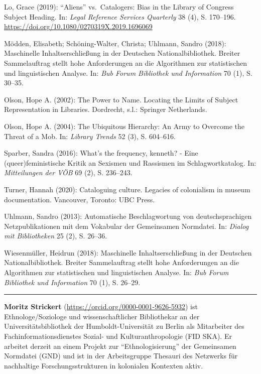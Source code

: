 \documentclass[a4paper,
fontsize=11pt,
oneside,
numbers=noperiodatend,
parskip=half-,
bibliography=totoc,
final
]{scrartcl}
\begin{document}
Lo, Grace (2019): \enquote{Aliens} vs.~Catalogers: Bias in the Library
of Congress Subject Heading. In: \emph{Legal Reference Services
Quarterly} 38 (4), S. 170--196.
\url{https://doi.org/10.1080/0270319X.2019.1696069}

Mödden, Elisabeth; Schöning-Walter, Christa; Uhlmann, Sandro (2018):
Maschinelle Inhaltserschließung in der Deutschen Nationalbibliothek.
Breiter Sammelauftrag stellt hohe Anforderungen an die Algorithmen zur
statistischen und linguistischen Analyse. In: \emph{Bub Forum Bibliothek
und Information} 70 (1), S. 30--35.

Olson, Hope A. (2002): The Power to Name. Locating the Limits of Subject
Representation in Libraries. Dordrecht, s.l.: Springer Netherlands.

Olson, Hope A. (2004): The Ubiquitous Hierarchy: An Army to Overcome the
Threat of a Mob. In: \emph{Library Trends} 52 (3), S. 604--616.

Sparber, Sandra (2016): What's the frequency, kenneth? - Eine
(queer)feministische Kritik an Sexismen und Rassismen im
Schlagwortkatalog. In: \emph{Mitteilungen der VÖB} 69 (2), S. 236--243.

Turner, Hannah (2020): Cataloguing culture. Legacies of colonialism in
museum documentation. Vancouver, Toronto: UBC Press.

Uhlmann, Sandro (2013): Automatische Beschlagwortung von
deutschsprachigen Netzpublikationen mit dem Vokabular der Gemeinsamen
Normdatei. In: \emph{Dialog mit Bibliotheken} 25 (2), S. 26--36.

Wiesenmüller, Heidrun (2018): Maschinelle Inhaltserschließung in der
Deutschen Nationalbibliothek. Breiter Sammelauftrag stellt hohe
Anforderungen an die Algorithmen zur statistischen und linguistischen
Analyse. In: \emph{Bub Forum Bibliothek und Information} 70 (1), S.
26--29.

\begin{center}\rule{0.5\linewidth}{0.5pt}\end{center}

\textbf{Moritz Strickert} (\url{https://orcid.org/0000-0001-9626-5932})
ist Ethnologe/Soziologe und wissenschaftlicher Bibliothekar an der
Universitätsbibliothek der Humboldt-Universität zu Berlin als
Mitarbeiter des Fachinformationsdienstes Sozial- und Kulturanthropologie
(FID SKA). Er arbeitet derzeit an einem Projekt zur \enquote{Ethnologisierung}
der Gemeinsamen Normdatei (GND) und ist in der Arbeitsgruppe Thesauri
des Netzwerks für nachhaltige Forschungsstrukturen in kolonialen
Kontexten aktiv.
\end{document}
